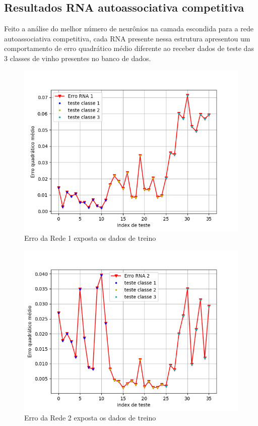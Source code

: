 \subsection{Resultados RNA autoassociativa competitiva}
Feito a análise do melhor número de neurônios na camada escondida para a rede autoassociativa competitiva, cada RNA presente nessa estrutura apresentou um comportamento de erro quadrático médio diferente ao receber dados de teste das 3 classes de vinho presentes no banco de dados.
\begin{figure}[H]
\centering %
\includegraphics[width=\columnwidth]{04-Figuras/Erro_classe1_auto}
\caption{Erro da Rede 1 exposta os dados de treino}
\label{figura:acuracia}
\end{figure}
\begin{figure}[H]
\centering %
\includegraphics[width=\columnwidth]{04-Figuras/Erro_classe2_auto}
\caption{Erro da Rede 2 exposta os dados de treino}
\label{figura:acuracia}
\end{figure}
